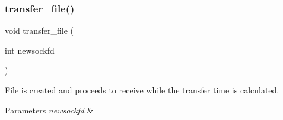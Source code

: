 \subsubsection{transfer\+\_\+file()}
{\footnotesize\ttfamily void transfer\+\_\+file (\begin{DoxyParamCaption}\item[{int}]{newsockfd }\end{DoxyParamCaption})}



File is created and proceeds to receive while the transfer time is calculated. 


\begin{DoxyParams}{Parameters}
{\em newsockfd} & \\
\hline
\end{DoxyParams}
